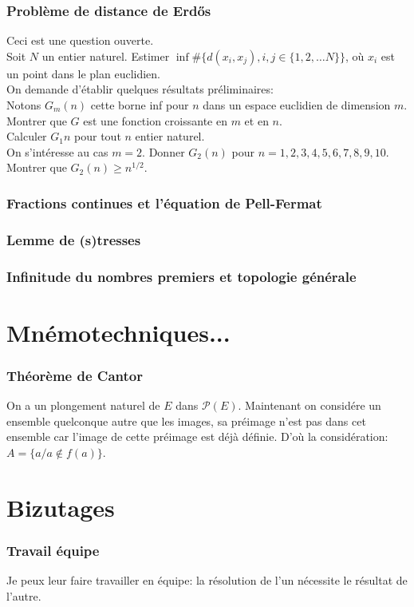\documentclass{article}
\begin{document}
\section{Probl\`eme de distance de Erd\H os}
Ceci est une question ouverte.\\
Soit $N$ un entier naturel. Estimer $\inf\#\{d(x_i,x_j), i,j\in\{1,2,\dots N\}\}$, o\`u $x_i$ est un point dans le plan euclidien.\\
On demande d'\'etablir quelques r\'esultats pr\'eliminaires:\\
Notons $G_m(n)$ cette borne inf pour $n$ dans un espace euclidien de dimension $m$.\\
Montrer que $G$ est une fonction croissante en $m$ et en $n$.\\
Calculer $G_1{n}$ pour tout $n$ entier naturel.\\
On s'int\'eresse au cas $m=2$. Donner $G_2(n)$ pour $n=1,2,3,4,5,6,7,8,9,10$.\\
Montrer que $G_2(n)\geq n^{1/2}$.

\section{Fractions continues et l'\'equation de Pell-Fermat}

\section{Lemme de (s)tresses}

\section{Infinitude du nombres premiers et topologie g\'en\'erale}

\part{Mn\'emotechniques...}
\section{Th\'eor\`eme de Cantor}
On a un plongement naturel de $E$ dans $\mathcal{P}(E)$. Maintenant on consid\'ere un ensemble quelconque autre que les images, sa pr\'eimage n'est pas dans cet ensemble car l'image de cette pr\'eimage est d\'ej\`a d\'efinie. D'o\`u la consid\'eration: $A=\{a/a\notin f(a)\}$.


\part{Bizutages}
\section{Travail \'equipe}
Je peux leur faire travailler en \'equipe: la r\'esolution de l'un n\'ecessite le r\'esultat de l'autre.
\end{document}

